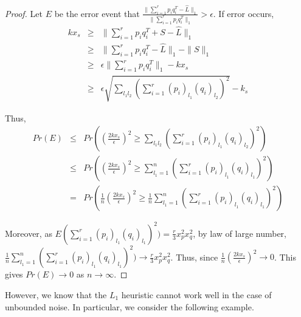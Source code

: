 \begin{proof}
Let $E$ be the error event that $\frac{\|\sum_{i=1}^{r}p_{i}q_{i}^{T}-\hat{L}\|_{1}}{\|\sum_{i=1}^{r}p_{i}q_{i}^{T}\|_{1}}>\epsilon$.
If error occurs,
\begin{eqnarray*}
kx_{s} & \ge & \|\sum_{i=1}^{r}p_{i}q_{i}^{T}+S-\hat{L}\|_{1}\\
 & \ge & \|\sum_{i=1}^{r}p_{i}q_{i}^{T}-\hat{L}\|_{1}-\|S\|_{1}\\
 & \ge & \epsilon\|\sum_{i=1}^{r}p_{i}q_{i}^{T}\|_{1}-kx_{s}\\
 & \ge & \epsilon\sqrt{\sum_{l_{1}l_{2}}(\sum_{i=1}^{r}(p_{i})_{l_{1}}(q_{i})_{l_{2}})^{2}}-k_{s}
\end{eqnarray*}


Thus,
\begin{eqnarray*}
Pr(E)
&\le & Pr \left( \left( \frac{2kx_{s}}{\epsilon} \right)^{2} \ge \sum_{l_{1}l_{2}} \left( \sum_{i=1}^{r}(p_{i})_{l_{1}}(q_{i})_{l_{2}} \right)^{2} \right)\\
&\le & Pr \left( \left( \frac{2kx_{s}}{\epsilon} \right)^{2} \ge \sum_{l_{1}=1}^{n} \left( \sum_{i=1}^{r}(p_{i})_{l_{1}}(q_{i})_{l_{1}} \right)^{2} \right)\\
&= & Pr \left( \frac{1}{n} \left( \frac{2kx_{s}}{\epsilon} \right)^{2} \ge \frac{1}{n} \sum_{l_{1}=1}^{n} \left( \sum_{i=1}^{r}(p_{i})_{l_{1}}(q_{i})_{l_{1}} \right)^{2} \right)
\end{eqnarray*}


Moreover, as $E(\sum_{i=1}^{r}(p_{i})_{l_{1}}(q_{i})_{l_{1}})^{2})=\frac{r}{3}x_{p}^{2}x_{q}^{2}$,
by law of large number, $\frac{1}{n}\sum_{l_{1}=1}^{n}(\sum_{i=1}^{r}(p_{i})_{l_{1}}(q_{i})_{l_{1}})^{2})\to\frac{r}{3}x_{p}^{2}x_{q}^{2}$.
Thus, since $\frac{1}{n}(\frac{2kx_{s}}{\epsilon})^{2}\to0$. This
gives $Pr(E)\to0$ as $n\to\infty$.
\end{proof}

However, we know that the $L_1$ heuristic cannot work well in the case of unbounded noise. In particular, we consider the following example. 

